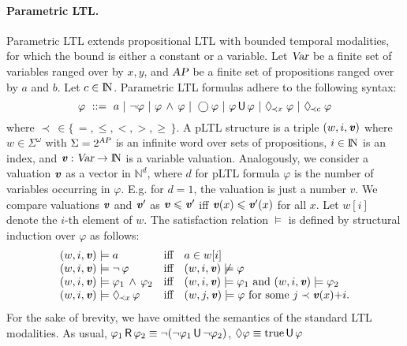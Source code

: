 \documentclass{llncs}
\newcommand{\where}{\ | \ }
\newcommand{\smAP}{\mbox{\scriptsize \sl AP}}
\newcommand{\Not}{\mbox{$\, \neg \,$}}
\newcommand{\true}{\mbox{true}}
\newcommand{\AP}{\mbox{\sl AP}}
\newcommand{\Var}{\mbox{\sl Var}}
\newcommand{\set}[1]{\{ \, #1 \, \}}
\newcommand{\Nats}{\mbox{${\rm I\!N}$}}
\newcommand{\Next}{\bigcirc \, }
\newcommand{\Until}{\mbox{$\, {\sf U}\,$}}
\newcommand{\U}{\Until}
\newcommand{\Release}{\mbox{$\, {\sf R}\,$}}
\newcommand{\X}{\Next}
\renewcommand{\leq}{\leqslant}
\renewcommand{\geq}{\geqslant}
\renewcommand{\a}[1]{\textbf{\textit{#1}}}
\newcommand{\ve}{{{\a v}}}
\newcommand{\de}{\Diamond}
\begin{document}
\paragraph{Parametric LTL.}
Parametric LTL extends propositional LTL with bounded temporal modalities, for which the bound is either a constant or a variable.
Let $\Var$ be a finite set of variables ranged over by $x, y$, and $\AP$ be a finite set of propositions ranged over by $a$ and $b$.
Let $c \in \Nats$.
Parametric LTL formulas adhere to the following syntax:
$$
\varphi \ ::= \ a \where \neg \varphi \where \varphi \, \wedge \, \varphi  \where \X\! \varphi \where \varphi \U\varphi \where 
\de_{\hspace{-0.05cm}\prec x} \hspace{0.1cm}\varphi \where \de_{\hspace{-0.05cm}\prec c}\hspace{0.1cm} \varphi
$$
where $\prec \, \in \set{=, \leq, <, >, \geq}$.
A pLTL structure is a triple $(w,i,{\a v})$ where $w \in \Sigma^\omega$ with $\Sigma = 2^{\smAP}$ is an infinite word over sets of propositions, 
$i \in \Nats$ is an index, and ${\a v}: \Var \to \Nats$ is a variable valuation.
Analogously, we consider a valuation ${\a v}$ as a vector in $\mathbb{N}^d$, where $d$ for pLTL formula $\varphi$ is the number of variables occurring in $\varphi$. 
E.g. for $d=1$, the valuation is just a number $v$.
We compare valuations $\ve$ and ${\a v}'$ as ${\a v} \leq {\a v}'$ iff ${\a v}(x) \leq {\a v}'(x)$ for all $x$.
Let $w[i]$ denote the $i$-th element of $w$.
The satisfaction relation $\models$ is defined by structural induction over $\varphi$  as follows:
$$
\begin{array}{lcl}
(w,i,{\a v}) \models a & \mbox{iff} & a \in w[i] \\
(w,i,{\a v}) \models \!\Not \varphi & \mbox{iff} & (w,i,{\a v}) \not\models \varphi \\
(w,i,{\a v}) \models \varphi_1 \, \wedge \, \varphi_2 & \mbox{iff} & (w,i,{\a v}) \models\varphi_1 \mbox{ and } (w,i,{\a v}) \models \varphi_2 \\
(w,i,{\a v}) \models \de_{\hspace{-0.05cm}\prec x} \, \varphi & \mbox{iff} &  
   (w,j,{\a v}) \models \varphi \mbox{ for some } j \prec \ve(x){+}i.  \\
\end{array}
$$  
For the sake of brevity, we have omitted the semantics of the standard LTL modalities. 
As usual, $\varphi_1\Release \varphi_2 \equiv \neg(\neg\varphi_1\U\neg\varphi_2)$, $\de \varphi \equiv \true \U \varphi$ 
\end{document}
